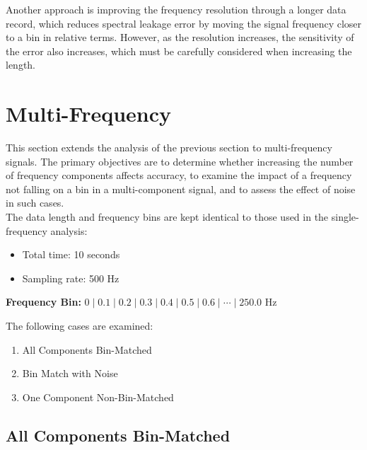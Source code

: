 \documentclass[../main]{subfiles}
\begin{document}
Another approach is improving the frequency resolution
through a longer data record, which reduces spectral leakage error by moving the signal frequency
closer to a bin in relative terms. However, as the resolution increases, the sensitivity of
the error also increases, which must be carefully considered when increasing the length.

\section{Multi-Frequency}

This section extends the analysis of the previous section to multi-frequency signals. The
primary objectives are to determine whether increasing the number of frequency components
affects accuracy, to examine the impact of a frequency not falling on a bin in a
multi-component signal, and to assess the effect of noise in such cases.\\

The data length and frequency bins are kept identical to those used in the single-frequency
analysis:

\begin{itemize}
    \setlength{\itemsep}{0pt}\setlength{\parskip}{0pt}
    \item Total time: 10 seconds
    \item Sampling rate: 500 Hz
\end{itemize}

\textbf{Frequency Bin:} $0 \mid 0.1 \mid 0.2 \mid 0.3 \mid 0.4 \mid 0.5 \mid 0.6 \mid \cdots \mid 250.0$ Hz

The following cases are examined:

\begin{enumerate}
    \setlength{\itemsep}{0pt}\setlength{\parskip}{0pt}
    \item All Components Bin-Matched
    \item Bin Match with Noise
    \item One Component Non-Bin-Matched
\end{enumerate}

\subsection{All Components Bin-Matched}
\end{document}
